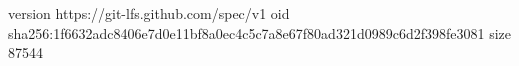 version https://git-lfs.github.com/spec/v1
oid sha256:1f6632adc8406e7d0e11bf8a0ec4c5c7a8e67f80ad321d0989c6d2f398fe3081
size 87544
